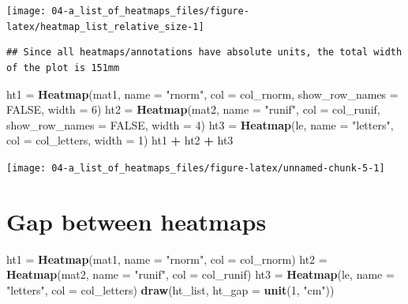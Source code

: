 \documentclass[]{book}
\newenvironment{Shaded}{\begin{snugshade}}{\end{snugshade}}
\newcommand{\KeywordTok}[1]{\textcolor[rgb]{0.13,0.29,0.53}{\textbf{#1}}}
\newcommand{\DataTypeTok}[1]{\textcolor[rgb]{0.13,0.29,0.53}{#1}}
\newcommand{\DecValTok}[1]{\textcolor[rgb]{0.00,0.00,0.81}{#1}}
\newcommand{\StringTok}[1]{\textcolor[rgb]{0.31,0.60,0.02}{#1}}
\newcommand{\OtherTok}[1]{\textcolor[rgb]{0.56,0.35,0.01}{#1}}
\newcommand{\OperatorTok}[1]{\textcolor[rgb]{0.81,0.36,0.00}{\textbf{#1}}}
\newcommand{\NormalTok}[1]{#1}
\theoremstyle{definition}
\theoremstyle{definition}
\theoremstyle{definition}
\theoremstyle{remark}
\begin{document}
\begin{center}\texttt{[image: 04-a\_list\_of\_heatmaps\_files/figure-latex/heatmap\_list\_relative\_size-1]} \end{center}

\begin{verbatim}
## Since all heatmaps/annotations have absolute units, the total width of the plot is 151mm
\end{verbatim}

\begin{Shaded}
\begin{Highlighting}[]
\NormalTok{ht1 =}\StringTok{ }\KeywordTok{Heatmap}\NormalTok{(mat1, }\DataTypeTok{name =} \StringTok{"rnorm"}\NormalTok{, }\DataTypeTok{col =}\NormalTok{ col_rnorm,}
    \DataTypeTok{show_row_names =} \OtherTok{FALSE}\NormalTok{, }\DataTypeTok{width =} \DecValTok{6}\NormalTok{)}
\NormalTok{ht2 =}\StringTok{ }\KeywordTok{Heatmap}\NormalTok{(mat2, }\DataTypeTok{name =} \StringTok{"runif"}\NormalTok{, }\DataTypeTok{col =}\NormalTok{ col_runif,}
    \DataTypeTok{show_row_names =} \OtherTok{FALSE}\NormalTok{, }\DataTypeTok{width =} \DecValTok{4}\NormalTok{)}
\NormalTok{ht3 =}\StringTok{ }\KeywordTok{Heatmap}\NormalTok{(le, }\DataTypeTok{name =} \StringTok{"letters"}\NormalTok{, }\DataTypeTok{col =}\NormalTok{ col_letters, }\DataTypeTok{width =} \DecValTok{1}\NormalTok{)}
\NormalTok{ht1 }\OperatorTok{+}\StringTok{ }\NormalTok{ht2 }\OperatorTok{+}\StringTok{ }\NormalTok{ht3}
\end{Highlighting}
\end{Shaded}

\begin{center}\texttt{[image: 04-a\_list\_of\_heatmaps\_files/figure-latex/unnamed-chunk-5-1]} \end{center}

\section{Gap between heatmaps}\label{gap-between-heatmaps}

\begin{Shaded}
\begin{Highlighting}[]
\NormalTok{ht1 =}\StringTok{ }\KeywordTok{Heatmap}\NormalTok{(mat1, }\DataTypeTok{name =} \StringTok{"rnorm"}\NormalTok{, }\DataTypeTok{col =}\NormalTok{ col_rnorm)}
\NormalTok{ht2 =}\StringTok{ }\KeywordTok{Heatmap}\NormalTok{(mat2, }\DataTypeTok{name =} \StringTok{"runif"}\NormalTok{, }\DataTypeTok{col =}\NormalTok{ col_runif)}
\NormalTok{ht3 =}\StringTok{ }\KeywordTok{Heatmap}\NormalTok{(le, }\DataTypeTok{name =} \StringTok{"letters"}\NormalTok{, }\DataTypeTok{col =}\NormalTok{ col_letters)}
\KeywordTok{draw}\NormalTok{(ht_list, }\DataTypeTok{ht_gap =} \KeywordTok{unit}\NormalTok{(}\DecValTok{1}\NormalTok{, }\StringTok{"cm"}\NormalTok{))}
\end{Highlighting}
\end{Shaded}
\end{document}
